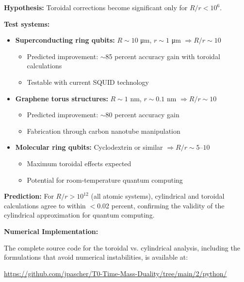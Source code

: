 \begin{experimentbox}
	\textbf{Hypothesis:} Toroidal corrections become significant only for $R/r < 10^6$.
	
	\textbf{Test systems:}
	\begin{itemize}
		\item \textbf{Superconducting ring qubits:} $R \sim 10$ μm, $r \sim 1$ μm $\Rightarrow R/r \sim 10$
		\begin{itemize}
			\item Predicted improvement: $\sim$85 percent accuracy gain with toroidal calculations
			\item Testable with current SQUID technology
		\end{itemize}
		
		\item \textbf{Graphene torus structures:} $R \sim 1$ nm, $r \sim 0.1$ nm $\Rightarrow R/r \sim 10$
		\begin{itemize}
			\item Predicted improvement: $\sim$80 percent accuracy gain
			\item Fabrication through carbon nanotube manipulation
		\end{itemize}
		
		\item \textbf{Molecular ring qubits:} Cyclodextrin or similar $\Rightarrow R/r \sim 5$--$10$
		\begin{itemize}
			\item Maximum toroidal effects expected
			\item Potential for room-temperature quantum computing
		\end{itemize}
	\end{itemize}
	
	\textbf{Prediction:} For $R/r > 10^{12}$ (all atomic systems), cylindrical and toroidal calculations agree to within $<$0.02 percent, confirming the validity of the cylindrical approximation for quantum computing.
\end{experimentbox}

\textbf{Numerical Implementation:}

The complete source code for the toroidal vs. cylindrical analysis, including the formulations that avoid numerical instabilities, is available at:

\begin{center}
	\url{https://github.com/jpascher/T0-Time-Mass-Duality/tree/main/2/python/}
\end{center}

